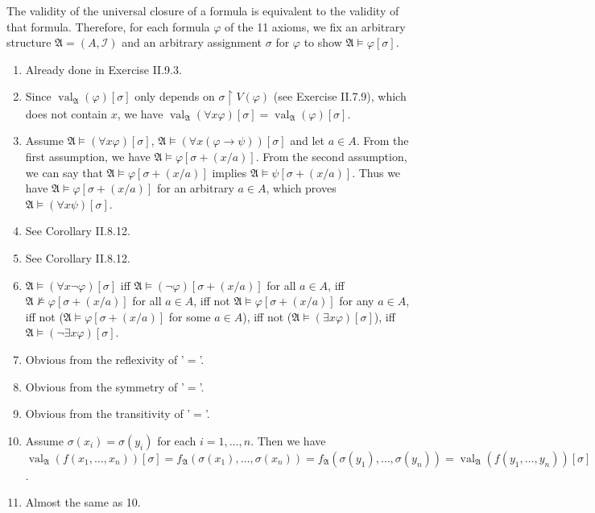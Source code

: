 \documentclass[12pt]{article}
\newcommand{\val}{\mathop{\mathrm{val}}}
\theoremstyle{definition}
\newenvironment{customthm}[1]
  {\renewcommand\theinnercustomthm{#1}\innercustomthm}
  {\endinnercustomthm}
\begin{document}
\begin{customthm}{II.10.2} The validity of the universal closure of a formula is equivalent to the validity of that formula. Therefore, for each formula $\varphi$ of the 11 axioms, we fix an arbitrary structure $\mathfrak{A}=(A,\mathcal{I})$ and an arbitrary assignment $\sigma$ for $\varphi$ to show $\mathfrak{A}\models\varphi[\sigma]$.
\begin{enumerate}
\item Already done in Exercise II.9.3.
\item Since $\val_\mathfrak{A}(\varphi)[\sigma]$ only depends on $\sigma\upharpoonright V(\varphi)$ (see Exercise II.7.9), which does not contain $x$, we have $\val_\mathfrak{A}(\forall x\varphi)[\sigma]=\val_\mathfrak{A}(\varphi)[\sigma]$.
\item Assume $\mathfrak{A}\models(\forall x\varphi)[\sigma]$, $\mathfrak{A}\models(\forall x(\varphi\rightarrow\psi))[\sigma]$ and let $a\in A$. From the first assumption, we have $\mathfrak{A}\models\varphi[\sigma+(x/a)]$. From the second assumption, we can say that $\mathfrak{A}\models\varphi[\sigma+(x/a)]$ implies $\mathfrak{A}\models\psi[\sigma+(x/a)]$. Thus we have $\mathfrak{A}\models\varphi[\sigma+(x/a)]$ for an arbitrary $a\in A$, which proves $\mathfrak{A}\models(\forall x\psi)[\sigma]$.
\item See Corollary II.8.12.
\item See Corollary II.8.12.
\item $\mathfrak{A}\models(\forall x\neg\varphi)[\sigma]$ iff $\mathfrak{A}\models(\neg\varphi)[\sigma+(x/a)]$ for all $a\in A$, iff $\mathfrak{A}\not\models\varphi[\sigma+(x/a)]$ for all $a\in A$, iff not $\mathfrak{A}\models\varphi[\sigma+(x/a)]$ for any $a\in A$, iff not ($\mathfrak{A}\models\varphi[\sigma+(x/a)]$ for some $a\in A$), iff not ($\mathfrak{A}\models(\exists x\varphi)[\sigma]$), iff $\mathfrak{A}\models(\neg\exists x\varphi)[\sigma]$.
\item Obvious from the reflexivity of '$=$'.
\item Obvious from the symmetry of '$=$'.
\item Obvious from the transitivity of '$=$'.
\item Assume $\sigma(x_i)=\sigma(y_i)$ for each $i=1,\ldots,n$. Then we have $\val_\mathfrak{A}(f(x_1,\ldots,x_n))[\sigma]=f_\mathfrak{A}(\sigma(x_1),\ldots,\sigma(x_n))=f_\mathfrak{A}(\sigma(y_1),\ldots,\sigma(y_n))=\val_\mathfrak{A}(f(y_1,\ldots,y_n))[\sigma]$.
\item Almost the same as 10.
\end{enumerate}
\end{customthm}
\end{document}
